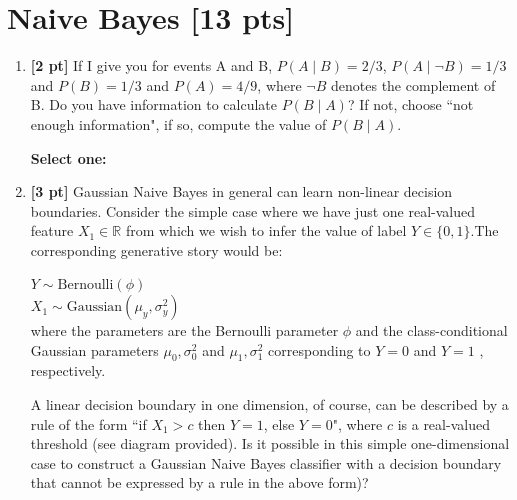 \documentclass{article}
\newcommand{\blackcircle}{\tikz\draw[black,fill=black] (0,0) circle (1ex);}
\renewcommand{\circle}{\tikz\draw[black] (0,0) circle (1ex);}
\begin{document}
\section{Naive Bayes [13 pts]}
\begin{enumerate}

    \item \textbf{[2 pt]} If I give you for events A and B, $P(A\mid B) = 2/3$, $P(A\mid \neg B) = 1/3$ and $P(B) = 1/3$ and $P(A) = 4/9$, where $\neg B$ denotes the complement of B. Do you have information to calculate $P(B\mid A)$? If not, choose ``not enough information", if so, compute the value of $P(B\mid A)$.

    \textbf{Select one:}
    
    \item \textbf{[3 pt]} Gaussian Naive Bayes in general can learn non-linear decision boundaries. Consider the simple case where we have just one real-valued feature $X_1\in\mathbb{R}$ from which we wish to infer the value of label $Y\in\{0,1\}$.The corresponding generative story would be:
    
    $Y \sim \text{Bernoulli}(\phi)$\\
    $X_1 \sim \text{Gaussian}(\mu_y, \sigma^2_y)$\\
    where the parameters are the Bernoulli parameter $\phi$  and the class-conditional Gaussian parameters $\mu_0, \sigma^2_0$ and $\mu_1, \sigma^2_1$   corresponding to $Y=0$ and $Y=1$ , respectively.

    A linear decision boundary in one dimension, of course, can be described by a rule of the form ``if $X_1>c$  then $Y=1$, else $Y=0$", where $c$ is a real-valued threshold (see diagram provided). Is it possible in this simple one-dimensional case to construct a Gaussian Naive Bayes classifier with a decision boundary that cannot be expressed by a rule in the above form)?


\end{enumerate}
\end{document}
